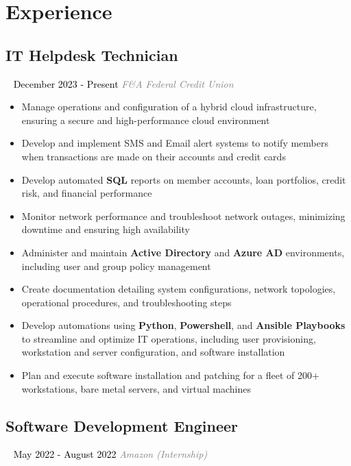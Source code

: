 \documentclass{article}
\newcommand{\resumesection}[3]{
    \subsection*{#1}
    \ 
    \normalsize
    \normalsize
    \hfill
    \textcolor{black}{#3}
    \normalsize
    \newline
    \small
    \textcolor{grey}{\emph{#2}}
}
\begin{document}
\pagestyle{useheader}
\section*{Experience}
\resumesection{IT Helpdesk Technician}{F\&A Federal Credit Union}{December 2023 - Present}
\begin{itemize}
    \item Manage operations and configuration of a hybrid cloud infrastructure, ensuring a secure and high-performance cloud environment
    \item Develop and implement SMS and Email alert systems to notify members when transactions are made on their accounts and credit cards
    \item Develop automated \textbf{SQL} reports on member accounts, loan portfolios, credit risk, and financial performance
    \item Monitor network performance and troubleshoot network outages, minimizing downtime and ensuring high availability
    \item Administer and maintain \textbf{Active Directory} and \textbf{Azure AD} environments, including user and group policy management
    \item Create documentation detailing system configurations, network topologies, operational procedures, and troubleshooting steps
    \item Develop automations using \textbf{Python}, \textbf{Powershell}, and \textbf{Ansible Playbooks} to streamline and optimize IT operations, including user provisioning, workstation and server configuration, and software installation
    \item Plan and execute software installation and patching for a fleet of 200+ workstations, bare metal servers, and virtual machines
\end{itemize}
\resumesection{Software Development Engineer}{Amazon (Internship)}{May 2022 - August 2022}
\end{document}
